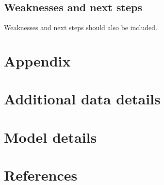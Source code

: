 \documentclass[
  letterpaper,
  DIV=11,
  numbers=noendperiod]{scrartcl}
\begin{document}
\subsection{Weaknesses and next steps}\label{weaknesses-and-next-steps}

Weaknesses and next steps should also be included.

\newpage

\appendix

\section*{Appendix}\label{appendix}

\section{Additional data details}\label{additional-data-details}

\section{Model details}\label{sec-model-details}

\newpage

\section*{References}\label{references}
\end{document}
